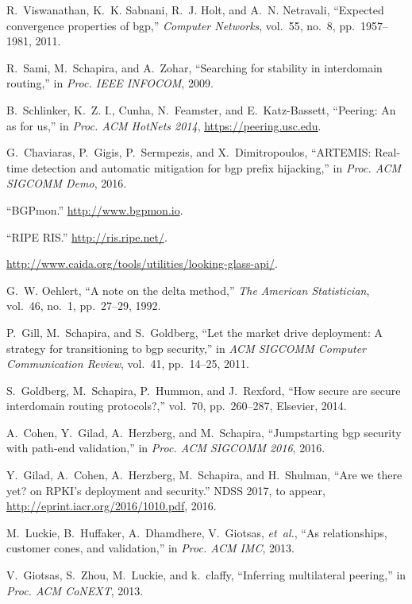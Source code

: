 \documentclass[10pt, conference, letterpaper]{IEEEtran}%
\begin{document}
\begin{thebibliography}{10}
R.~Viswanathan, K.~K. Sabnani, R.~J. Holt, and A.~N. Netravali, ``Expected
  convergence properties of bgp,'' {\em Computer Networks}, vol.~55, no.~8,
  pp.~1957--1981, 2011.

R.~Sami, M.~Schapira, and A.~Zohar, ``Searching for stability in interdomain
  routing,'' in {\em Proc. IEEE INFOCOM}, 2009.

B.~Schlinker, K.~Z. I., Cunha, N.~Feamster, and E.~Katz-Bassett, ``Peering: An
  as for us,'' in {\em Proc. ACM HotNets 2014}, \url{https://peering.usc.edu}.

G.~Chaviaras, P.~Gigis, P.~Sermpezis, and X.~Dimitropoulos, ``{ARTEMIS}:
  Real-time detection and automatic mitigation for bgp prefix hijacking,'' in
  {\em Proc. ACM SIGCOMM Demo}, 2016.

``{BGP}mon.'' \url{http://www.bgpmon.io}.

``{RIPE RIS}.'' \url{http://ris.ripe.net/}.

\url{http://www.caida.org/tools/utilities/looking-glass-api/}.

G.~W. Oehlert, ``A note on the delta method,'' {\em The American Statistician},
  vol.~46, no.~1, pp.~27--29, 1992.

P.~Gill, M.~Schapira, and S.~Goldberg, ``Let the market drive deployment: A
  strategy for transitioning to bgp security,'' in {\em ACM SIGCOMM Computer
  Communication Review}, vol.~41, pp.~14--25, 2011.

S.~Goldberg, M.~Schapira, P.~Hummon, and J.~Rexford, ``How secure are secure
  interdomain routing protocols?,'' vol.~70, pp.~260--287, Elsevier, 2014.

A.~Cohen, Y.~Gilad, A.~Herzberg, and M.~Schapira, ``Jumpstarting bgp security
  with path-end validation,'' in {\em Proc. ACM SIGCOMM 2016}, 2016.

Y.~Gilad, A.~Cohen, A.~Herzberg, M.~Schapira, and H.~Shulman, ``Are we there
  yet? on {RPKI}'s deployment and security.'' NDSS 2017, to appear,
  \url{http://eprint.iacr.org/2016/1010.pdf}, 2016.

M.~Luckie, B.~Huffaker, A.~Dhamdhere, V.~Giotsas, {\em et~al.}, ``As
  relationships, customer cones, and validation,'' in {\em Proc. ACM IMC},
  2013.

V.~Giotsas, S.~Zhou, M.~Luckie, and k.~claffy, ``Inferring multilateral
  peering,'' in {\em Proc. ACM CoNEXT}, 2013.

\end{thebibliography}
%




\appendices

\end{document}
